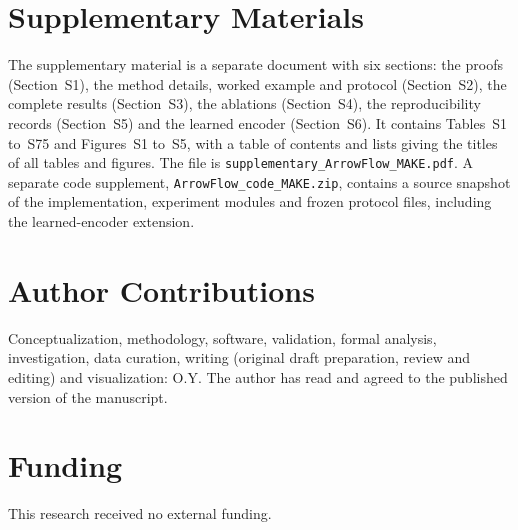 \documentclass[12pt]{article}
\begin{document}










\section*{Supplementary Materials}
The supplementary material is a separate document with six sections: the proofs (Section~S1), the method details, worked example and protocol (Section~S2), the complete results (Section~S3), the ablations (Section~S4), the reproducibility records (Section~S5) and the learned encoder (Section~S6). It contains Tables~S1 to~S75 and Figures~S1 to~S5, with a table of contents and lists giving the titles of all tables and figures. The file is \nolinkurl{supplementary_ArrowFlow_MAKE.pdf}. A separate code supplement, \nolinkurl{ArrowFlow_code_MAKE.zip}, contains a source snapshot of the implementation, experiment modules and frozen protocol files, including the learned-encoder extension.

\section*{Author Contributions}
Conceptualization, methodology, software, validation, formal analysis, investigation, data curation, writing (original draft preparation, review and editing) and visualization: O.Y. The author has read and agreed to the published version of the manuscript.

\section*{Funding}
This research received no external funding.
\end{document}
